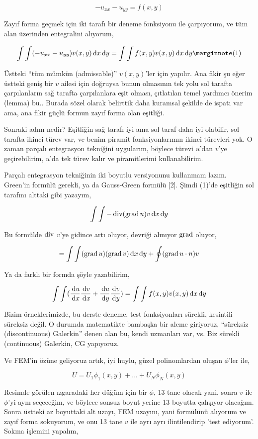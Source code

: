 \documentclass[12pt,fleqn]{article}\usepackage{../../common}
\begin{document}
$$
-u_{xx} - u_{yy} = f(x,y)
$$

Zayıf forma geçmek için iki tarafı bir deneme fonksiyonu ile çarpıyorum,
ve tüm alan üzerinden entegralini alıyorum,

$$
\int \int (-u_{xx} - u_{yy}) v(x,y) \ud x \ud y =
\int \int f(x,y) v(x,y)  \ud x \ud y
\mlabel{1}
$$

Üstteki ``tüm mümkün (admissable)'' $v(x,y)$'ler için yapılır. Ana fikir şu eğer
üstteki geniş bir $v$ ailesi için doğruysa bunun olmasının tek yolu sol tarafta
çarpılanların sağ tarafta çarpılanlara eşit olması, çıtlatılan temel yardımcı
önerim (lemma) bu.. Burada sözel olarak belirttik daha kuramsal şekilde de
ispatı var ama, ana fikir güçlü formun zayıf forma olan eşitliği.

Sonraki adım nedir? Eşitliğin sağ tarafı iyi ama sol taraf daha iyi olabilir,
sol tarafta ikinci türev var, ve benim piramit fonksiyonlarımın ikinci türevleri
yok. O zaman parçalı entegrasyon tekniğini uygularım, böylece türevi $u$'dan
$v$'ye geçirebilirim, $u$'da tek türev kalır ve piramitlerimi kullanabilirim.

Parçalı entegrasyon tekniğinin iki boyutlu versiyonunu kullanmam lazım. Green'in
formülü gerekli, ya da Gauss-Green formülü [2]. Şimdi (1)'de eşitliğin
sol tarafını alttaki gibi yazayım,

$$
\int \int -\operatorname{div} (\operatorname{grad} u) v \,\mathrm{d} x \,\mathrm{d} y
$$

Bu formülde  $\operatorname{div}$ $v$'ye gidince artı oluyor, devriği alınıyor $\operatorname{grad}$
oluyor, 

$$
= \int \int
(\operatorname{grad} u) (\operatorname{grad} v) \,\mathrm{d} x \,\mathrm{d} y  +
\oint (\operatorname{grad} u \cdot n) v
$$

Ya da farklı bir formda şöyle yazabilirim, 

$$
\int \int
(
\frac{\,\mathrm{d} u}{\,\mathrm{d} x} \frac{\,\mathrm{d} v}{\,\mathrm{d} x} +
\frac{\,\mathrm{d} u}{\,\mathrm{d} y} \frac{\,\mathrm{d} v}{\,\mathrm{d} y} 
) =
\int \int f(x,y) v(x,y)  \,\mathrm{d} x \,\mathrm{d} y
$$

Bizim örneklerimizde, bu derste deneme, test fonksiyonları sürekli, kesintili
süreksiz değil. O durumda matematikte bambaşka bir aleme giriyoruz, ``süreksiz
(discontinuous) Galerkin'' denen alan bu, kendi uzmanları var, vs. Biz sürekli
(continuous) Galerkin, CG yapıyoruz.

Ve FEM'in özüne geliyoruz artık, iyi huylu, güzel polinomlardan oluşan
$\phi$'ler ile,

$$
U = U_1 \phi_1 (x,y) + ... + U_N \phi_N (x,y) 
$$

Resimde görülen ızgaradaki her düğüm için bir $\phi$, 13 tane olacak yani, sonra
$v$ ile $\phi$'yi aynı seçeceğim, ve böylece sonsuz boyut yerine 13 boyutta
çalışıyor olacağım. Sonra üstteki az boyuttaki alt uzayı, FEM uzayını, yani
formülünü alıyorum ve zayıf forma sokuyorum, ve onu 13 tane $v$ ile ayrı ayrı
ilintilendirip 'test ediyorum'. Sokma işlemini yapalım,
\end{document}
